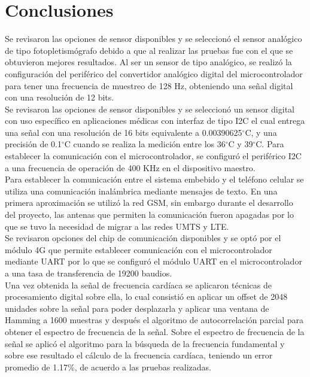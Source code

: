 
\section{Conclusiones}

Se revisaron las opciones de sensor disponibles y se seleccionó el sensor analógico de tipo fotopletismógrafo debido a que al realizar las pruebas fue con el que se obtuvieron mejores resultados. Al ser un sensor de tipo analógico, se realizó la configuración del periférico del convertidor analógico digital del microcontrolador para tener una frecuencia de muestreo de 128 Hz, obteniendo una señal digital con una resolución de 12 bits.\\

Se revisaron las opciones de sensor disponibles y se seleccionó un sensor digital con uso específico en aplicaciones médicas con interfaz de tipo I2C el cual entrega una señal con una resolución de 16 bits equivalente a 0.00390625$^{\circ}$C, y una precisión de 0.1$^{\circ}$C cuando se realiza la medición entre los 36$^{\circ}$C y 39$^{\circ}$C. Para establecer la comunicación con el microcontrolador, se configuró el periférico I2C a una frecuencia de operación de 400 KHz en el dispositivo maestro. \\

Para establecer la comunicación entre el sistema embebido y el teléfono celular se utiliza una comunicación inalámbrica mediante mensajes de texto. En una primera aproximación se utilizó la red GSM, sin embargo durante el desarrollo del proyecto, las antenas que permiten la comunicación fueron apagadas por lo que se tuvo la necesidad de migrar a las redes UMTS y LTE.\\

Se revisaron opciones del chip de comunicación disponibles y se optó por el módulo 4G que permite establecer comunicación con el microcontrolador mediante UART por lo que se configuró el módulo UART en el microcontrolador a una tasa de transferencia de 19200 baudios.\\

Una vez obtenida la señal de frecuencia cardíaca se aplicaron técnicas de procesamiento digital sobre ella, lo cual consistió en aplicar un offset de 2048 unidades sobre la señal para poder desplazarla y aplicar una ventana de Hamming a 1600 muestras y después el algoritmo de autocorrelación parcial para obtener el espectro de frecuencia de la señal. Sobre el espectro de frecuencia de la señal se aplicó el algoritmo para la búsqueda de la frecuencia fundamental y sobre ese resultado el cálculo de la frecuencia cardíaca, teniendo un error promedio de 1.17\%, de acuerdo a las pruebas realizadas.\\

